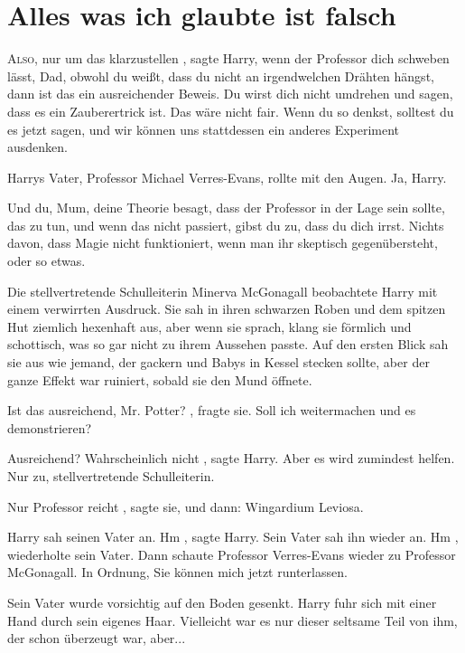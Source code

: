 \chapter{Alles was ich glaubte ist falsch}

\lettrine{\glqq A}{lso}, nur um das klarzustellen\grqq{} , sagte Harry, \glqq wenn der
Professor dich schweben lässt, Dad, obwohl du weißt, dass du nicht an
irgendwelchen Drähten hängst, dann ist das ein ausreichender Beweis. Du wirst
dich nicht umdrehen und sagen, dass es ein Zauberertrick ist. Das wäre nicht
fair. Wenn du so denkst, solltest du es jetzt sagen, und wir können uns
stattdessen ein anderes Experiment ausdenken.\grqq{}

Harrys Vater, Professor Michael Verres-Evans, rollte mit den Augen. \glqq Ja,
Harry.\grqq{}

\glqq Und du, Mum, deine Theorie besagt, dass der Professor in der Lage sein
sollte, das zu tun, und wenn das nicht passiert, gibst du zu, dass du dich
irrst. Nichts davon, dass Magie nicht funktioniert, wenn man ihr skeptisch
gegenübersteht, oder so etwas.\grqq{}

Die stellvertretende Schulleiterin Minerva McGonagall beobachtete Harry mit
einem verwirrten Ausdruck. Sie sah in ihren schwarzen Roben und dem spitzen Hut
ziemlich hexenhaft aus, aber wenn sie sprach, klang sie förmlich und schottisch,
was so gar nicht zu ihrem Aussehen passte. Auf den ersten Blick sah sie aus wie
jemand, der gackern und Babys in Kessel stecken sollte, aber der ganze Effekt
war ruiniert, sobald sie den Mund öffnete.

\glqq Ist das ausreichend, Mr. Potter?\grqq{} , fragte sie. \glqq Soll ich weitermachen
und es demonstrieren?\grqq{}

\glqq Ausreichend? Wahrscheinlich nicht\grqq{} , sagte Harry. \glqq Aber es wird
zumindest helfen. Nur zu, stellvertretende Schulleiterin.\grqq{}

\glqq Nur Professor reicht\grqq{} , sagte sie, und dann: \glqq Wingardium
Leviosa.\grqq{}

Harry sah seinen Vater an. \glqq Hm\grqq{} , sagte Harry. Sein Vater sah ihn wieder an.
\glqq Hm\grqq{} , wiederholte sein Vater. Dann schaute Professor Verres-Evans wieder zu
Professor McGonagall. \glqq In Ordnung, Sie können mich jetzt
runterlassen.\grqq{}

Sein Vater wurde vorsichtig auf den Boden gesenkt. Harry fuhr sich mit einer
Hand durch sein eigenes Haar. Vielleicht war es nur dieser seltsame Teil von
ihm, der schon überzeugt war, aber...

